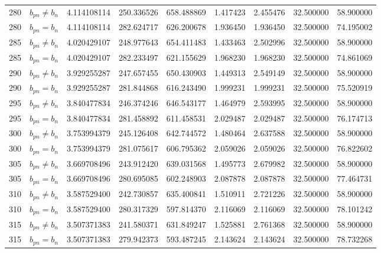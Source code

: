 \begin{longtable}{r l r r r r r r r}
280 & $b_{pn} \neq b_n$ & 4.114108114 & 250.336526 & 658.488869 & 1.417423 & 2.455476 & 32.500000 & 58.900000 \\
280 & $b_{pn} = b_n$ & 4.114108114 & 282.624717 & 626.200678 & 1.936450 & 1.936450 & 32.500000 & 74.195002 \\
285 & $b_{pn} \neq b_n$ & 4.020429107 & 248.977643 & 654.411483 & 1.433463 & 2.502996 & 32.500000 & 58.900000 \\
285 & $b_{pn} = b_n$ & 4.020429107 & 282.233497 & 621.155629 & 1.968230 & 1.968230 & 32.500000 & 74.861069 \\
290 & $b_{pn} \neq b_n$ & 3.929255287 & 247.657455 & 650.430903 & 1.449313 & 2.549149 & 32.500000 & 58.900000 \\
290 & $b_{pn} = b_n$ & 3.929255287 & 281.844868 & 616.243490 & 1.999231 & 1.999231 & 32.500000 & 75.520919 \\
295 & $b_{pn} \neq b_n$ & 3.840477834 & 246.374246 & 646.543177 & 1.464979 & 2.593995 & 32.500000 & 58.900000 \\
295 & $b_{pn} = b_n$ & 3.840477834 & 281.458892 & 611.458531 & 2.029487 & 2.029487 & 32.500000 & 76.174713 \\
300 & $b_{pn} \neq b_n$ & 3.753994379 & 245.126408 & 642.744572 & 1.480464 & 2.637588 & 32.500000 & 58.900000 \\
300 & $b_{pn} = b_n$ & 3.753994379 & 281.075617 & 606.795362 & 2.059026 & 2.059026 & 32.500000 & 76.822602 \\
305 & $b_{pn} \neq b_n$ & 3.669708496 & 243.912420 & 639.031568 & 1.495773 & 2.679982 & 32.500000 & 58.900000 \\
305 & $b_{pn} = b_n$ & 3.669708496 & 280.695085 & 602.248903 & 2.087878 & 2.087878 & 32.500000 & 77.464731 \\
310 & $b_{pn} \neq b_n$ & 3.587529400 & 242.730857 & 635.400841 & 1.510911 & 2.721226 & 32.500000 & 58.900000 \\
310 & $b_{pn} = b_n$ & 3.587529400 & 280.317329 & 597.814370 & 2.116069 & 2.116069 & 32.500000 & 78.101242 \\
315 & $b_{pn} \neq b_n$ & 3.507371383 & 241.580371 & 631.849247 & 1.525881 & 2.761368 & 32.500000 & 58.900000 \\
315 & $b_{pn} = b_n$ & 3.507371383 & 279.942373 & 593.487245 & 2.143624 & 2.143624 & 32.500000 & 78.732268 \\
        \end{longtable}
